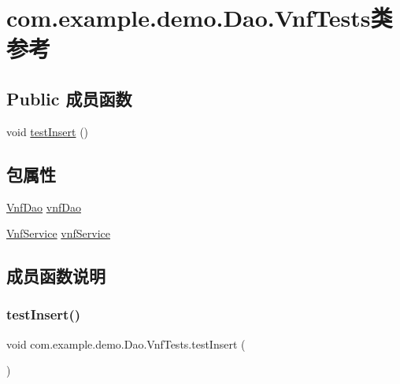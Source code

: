 \hypertarget{classcom_1_1example_1_1demo_1_1_dao_1_1_vnf_tests}{}\section{com.\+example.\+demo.\+Dao.\+Vnf\+Tests类 参考}
\label{classcom_1_1example_1_1demo_1_1_dao_1_1_vnf_tests}
\subsection*{Public 成员函数}
\begin{DoxyCompactItemize}
\item 
void \mbox{\hyperlink{classcom_1_1example_1_1demo_1_1_dao_1_1_vnf_tests_a2cb5114ce69182156181f0f33e0c9c75}{test\+Insert}} ()
\end{DoxyCompactItemize}
\subsection*{包属性}
\begin{DoxyCompactItemize}
\item 
\mbox{\hyperlink{interfacecom_1_1example_1_1demo_1_1dao_1_1_vnf_dao}{Vnf\+Dao}} \mbox{\hyperlink{classcom_1_1example_1_1demo_1_1_dao_1_1_vnf_tests_a27359492ef99fe1ff69932b578d5b9a8}{vnf\+Dao}}
\item 
\mbox{\hyperlink{classcom_1_1example_1_1demo_1_1service_1_1_vnf_service}{Vnf\+Service}} \mbox{\hyperlink{classcom_1_1example_1_1demo_1_1_dao_1_1_vnf_tests_ad72023180c0c5b7bc3e18f3158a79257}{vnf\+Service}}
\end{DoxyCompactItemize}


\subsection{成员函数说明}
\mbox{\label{classcom_1_1example_1_1demo_1_1_dao_1_1_vnf_tests_a2cb5114ce69182156181f0f33e0c9c75}} 
\subsubsection{\texorpdfstring{test\+Insert()}{testInsert()}}
{\footnotesize\ttfamily void com.\+example.\+demo.\+Dao.\+Vnf\+Tests.\+test\+Insert (\begin{DoxyParamCaption}{ }\end{DoxyParamCaption})}



